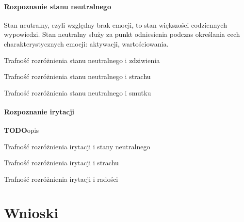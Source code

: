 \documentclass[a4paper,12pt,twoside,openany]{report}
\newcommand{\TODO}{\textbf{TODO}}
\newcommand*\NewPage{\newpage\null\thispagestyle{empty}\newpage}
\begin{document}
\subsubsection{Rozpoznanie stanu neutralnego}
Stan neutralny, czyli względny brak emocji, to stan większości codziennych wypowiedzi.
Stan neutralny służy za punkt odniesienia podczas określania cech charakterystycznych emocji: aktywacji, wartościowania.
\begin{table}[hc!]
	\centering
	
	\caption{Trafność rozróżnienia stanu neutralnego i zdziwienia}
	\label{tab:smutek:neutralny}
\end{table}
\begin{table}[hc!]
	\centering
	
	\caption{Trafność rozróżnienia stanu neutralnego i strachu}
	\label{tab:smutek:neutralny}
\end{table}
\begin{table}[hc!]
	\centering
	
	\caption{Trafność rozróżnienia stanu neutralnego i smutku}
	\label{tab:smutek:neutralny}
\end{table}
\subsubsection{Rozpoznanie irytacji}
\TODO{opis}
\begin{table}[hc!]
	\centering
	
	\caption{Trafność rozróżnienia irytacji i stany neutralnego}
	\label{tab:smutek:neutralny}
\end{table}
\begin{table}[hc!]
	\centering
	
	\caption{Trafność rozróżnienia irytacji i strachu}
	\label{tab:smutek:neutralny}
\end{table}
\begin{table}[hc!]
	\centering
	
	\caption{Trafność rozróżnienia irytacji i radości}
	\label{tab:smutek:neutralny}
\end{table}
\chapter{Wnioski}
\NewPage
\NewPage

{}

\end{document}
